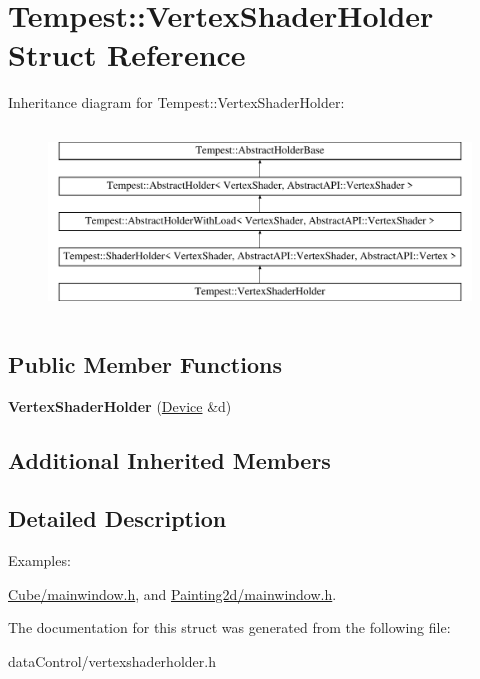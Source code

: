 \hypertarget{struct_tempest_1_1_vertex_shader_holder}{\section{Tempest\+:\+:Vertex\+Shader\+Holder Struct Reference}
\label{struct_tempest_1_1_vertex_shader_holder}
}
Inheritance diagram for Tempest\+:\+:Vertex\+Shader\+Holder\+:\begin{figure}[H]
\begin{center}
\leavevmode
\includegraphics[height=5.000000cm]{struct_tempest_1_1_vertex_shader_holder}
\end{center}
\end{figure}
\subsection*{Public Member Functions}
\begin{DoxyCompactItemize}
\item 
\hypertarget{struct_tempest_1_1_vertex_shader_holder_a03803af6e8a8418a54d001c7c4e1b2ec}{{\bfseries Vertex\+Shader\+Holder} (\hyperlink{class_tempest_1_1_device}{Device} \&d)}\label{struct_tempest_1_1_vertex_shader_holder_a03803af6e8a8418a54d001c7c4e1b2ec}

\end{DoxyCompactItemize}
\subsection*{Additional Inherited Members}


\subsection{Detailed Description}
\begin{Desc}
\item[Examples\+: ]\par
\hyperlink{_cube_2mainwindow_8h-example}{Cube/mainwindow.\+h}, and \hyperlink{_painting2d_2mainwindow_8h-example}{Painting2d/mainwindow.\+h}.\end{Desc}


The documentation for this struct was generated from the following file\+:\begin{DoxyCompactItemize}
\item 
data\+Control/vertexshaderholder.\+h\end{DoxyCompactItemize}
